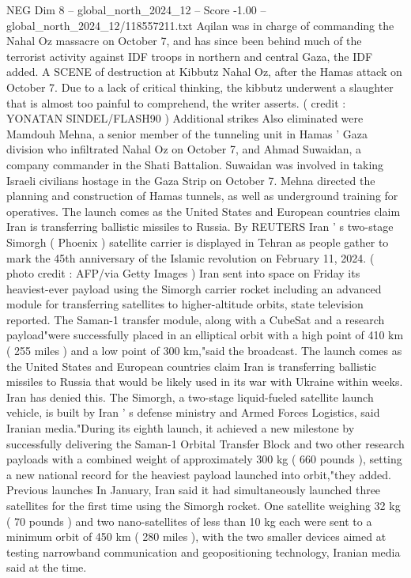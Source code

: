\begin{textsample}{NEG Dim 8 – global\_north\_2024\_12 – Score -1.00 – global\_north\_2024\_12/118557211.txt}  \label{ex:f8_neg_355}
Aqilan was in charge of commanding the Nahal Oz massacre on October 7, and has since been behind much of the terrorist activity against IDF troops in northern and central Gaza, the IDF added.
A SCENE of destruction at Kibbutz Nahal Oz, after the Hamas attack on October 7.
Due to a lack of critical thinking, the kibbutz underwent a slaughter that is almost too painful to comprehend, the writer asserts. ( credit : YONATAN SINDEL/FLASH90 ) Additional strikes Also eliminated were Mamdouh Mehna, a senior member of the tunneling unit in Hamas ' Gaza division who infiltrated Nahal Oz on October 7, and Ahmad Suwaidan, a company commander in the Shati Battalion.
Suwaidan was involved in taking Israeli civilians hostage in the Gaza Strip on October 7.
Mehna directed the planning and construction of Hamas tunnels, as well as underground training for operatives.
The launch comes as the United States and European countries claim Iran is transferring ballistic missiles to Russia.
By REUTERS Iran ' s two-stage Simorgh ( Phoenix ) satellite carrier is displayed in Tehran as people gather to mark the 45th anniversary of the Islamic revolution on February 11, 2024. ( photo credit : AFP/via Getty Images ) Iran sent into space on Friday its heaviest-ever payload using the Simorgh carrier rocket including an advanced module for transferring satellites to higher-altitude orbits, state television reported.
The Saman-1 transfer module, along with a CubeSat and a research payload"were successfully placed in an elliptical orbit with a high point of 410 km ( 255 miles ) and a low point of 300 km,"said the broadcast.
The launch comes as the United States and European countries claim Iran is transferring ballistic missiles to Russia that would be likely used in its war with Ukraine within weeks.
Iran has denied this.
The Simorgh, a two-stage liquid-fueled satellite launch vehicle, is built by Iran ' s defense ministry and Armed Forces Logistics, said Iranian media."During its eighth launch, it achieved a new milestone by successfully delivering the Saman-1 Orbital Transfer Block and two other research payloads with a combined weight of approximately 300 kg ( 660 pounds ), setting a new national record for the heaviest payload launched into orbit,"they added.
Previous launches In January, Iran said it had simultaneously launched three satellites for the first time using the Simorgh rocket.
One satellite weighing 32 kg ( 70 pounds ) and two nano-satellites of less than 10 kg each were sent to a minimum orbit of 450 km ( 280 miles ), with the two smaller devices aimed at testing narrowband communication and geopositioning technology, Iranian media said at the time.

\end{textsample}
